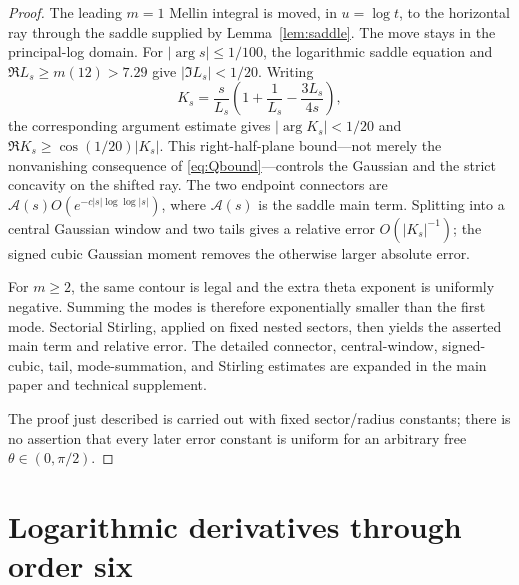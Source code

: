 \documentclass[11pt]{article}
\theoremstyle{definition}
\theoremstyle{remark}
\begin{document}
\begin{proof}
The leading $m=1$ Mellin integral is moved, in $u=\log t$, to the horizontal
ray through the saddle supplied by Lemma~\ref{lem:saddle}.  The move stays in
the principal-log domain.  For $|\arg s|\le1/100$, the logarithmic saddle
equation and $\Re L_s\ge m(12)>7.29$ give $|\Im L_s|<1/20$.  Writing
\[
 K_s=\frac{s}{L_s}\left(1+\frac1{L_s}-\frac{3L_s}{4s}\right),
\]
the corresponding argument estimate gives
$|\arg K_s|<1/20$ and
$\Re K_s\ge\cos(1/20)|K_s|$.  This right-half-plane bound---not merely the
nonvanishing consequence of \eqref{eq:Qbound}---controls the Gaussian and
the strict concavity on the shifted ray.  The two endpoint connectors are
$\mathcal A(s)O(e^{-c|s|\log\log|s|})$, where $\mathcal A(s)$ is the saddle
main term.  Splitting into a central Gaussian window and two tails gives a
relative error $O(|K_s|^{-1})$; the signed cubic Gaussian moment removes the
otherwise larger absolute error.

For $m\ge2$, the same contour is legal and the extra theta exponent is
uniformly negative.  Summing the modes is therefore exponentially smaller
than the first mode.  Sectorial Stirling, applied on fixed nested sectors,
then yields the asserted main term and relative error.  The detailed
connector, central-window, signed-cubic, tail, mode-summation, and Stirling
estimates are expanded in the main paper and technical supplement.

The proof just described is carried out with fixed sector/radius constants;
there is no assertion that every later error constant is uniform for an
arbitrary free $\theta\in(0,\pi/2)$.
\end{proof}

\section{Logarithmic derivatives through order six}\label{sec:deriv}
\end{document}
